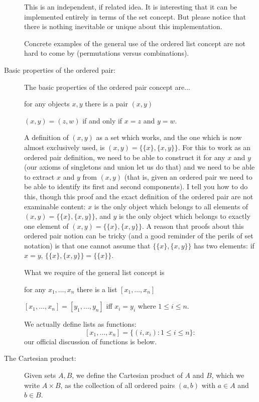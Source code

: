 \documentclass[12pt]{article}
\begin{document}
\begin{description}
This is an independent, if related idea.  It is interesting that it can be implemented entirely in terms of the set concept.  But please notice that there is nothing inevitable or unique about this implementation.

Concrete examples of the general use of the ordered list concept are not hard to come by (permutations versus combinations).

\item[Basic properties of the ordered pair:]

The basic properties of the ordered pair concept are...

for any objects $x,y$ there is a pair $(x,y)$

$(x,y) = (z,w)$ if and only if $x=z$ and $y=w$.

A definition of $(x,y)$ as a set which works, and the one which is now almost exclusively used, is $(x,y) = \{\{x\},\{x,y\}\}$.  For this to work as an ordered pair definition, we
need to be able to construct it for any $x$ and $y$ (our axioms of singletons and union let us do that) and we need to be able to extract $x$ and $y$ from $(x,y)$ (that is, given an ordered pair we need to be able to identify its first and second components).  I tell you how to do this, though this proof and the exact definition of the ordered pair are not examinable content:  $x$ is the only object which belongs to all  elements of $(x,y) = \{\{x\},\{x,y\}\}$, and
$y$ is the only object which belongs to exactly one element of $(x,y) = \{\{x\},\{x,y\}\}$.  A reason that proofs about this ordered pair notion can be tricky (and a good reminder of the perils of set notation) is that one cannot assume that $\{\{x\},\{x,y\}\}$ has two elements:  if $x=y$, $\{\{x\},\{x,y\}\}= \{\{x\}\}$.

What we require of the general list concept is

for any $x_1,\ldots,x_n$ there is a list $[x_1,\ldots,x_n]$

$[x_1,\ldots,x_n] = [y_1,\ldots,y_n]$ iff $x_i = y_i$ where $1 \leq i \leq n$.

We actually define lists as functions:  $$[x_1,\ldots,x_n] = \{(i,x_i):1 \leq i \leq n\}:$$ our official discussion of functions is below.





\item[The Cartesian product:]

Given sets $A,B$, we define the Cartesian product of $A$ and $B$, which we write $A \times B$,  as the collection of all ordered pairs
$(a,b)$ with $a \in A$ and $b \in B$.


\end{description}
\end{document}
